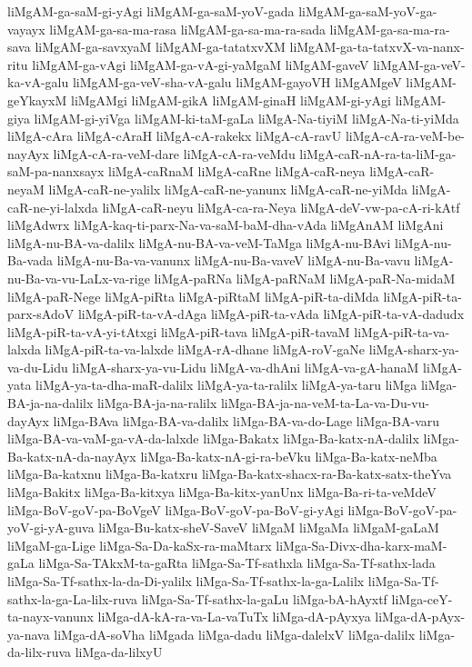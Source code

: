 {liMgAM-ga-saM-gi-yAgi
liMgAM-ga-saM-yoV-gada
liMgAM-ga-saM-yoV-ga-vayayx
liMgAM-ga-sa-ma-rasa
liMgAM-ga-sa-ma-ra-sada
liMgAM-ga-sa-ma-ra-sava
liMgAM-ga-savxyaM
liMgAM-ga-tatatxvXM
liMgAM-ga-ta-tatxvX-va-nanx-ritu
liMgAM-ga-vAgi
liMgAM-ga-vA-gi-yaMgaM
liMgAM-gaveV
liMgAM-ga-veV-ka-vA-galu
liMgAM-ga-veV-sha-vA-galu
liMgAM-gayoVH
liMgAMgeV
liMgAM-geYkayxM
liMgAMgi
liMgAM-gikA
liMgAM-ginaH
liMgAM-gi-yAgi
liMgAM-giya
liMgAM-gi-yiVga
liMgAM-ki-taM-gaLa
liMgA-Na-tiyiM
liMgA-Na-ti-yiMda
liMgA-cAra
liMgA-cAraH
liMgA-cA-rakekx
liMgA-cA-ravU
liMgA-cA-ra-veM-be-nayAyx
liMgA-cA-ra-veM-dare
liMgA-cA-ra-veMdu
liMgA-caR-nA-ra-ta-liM-ga-saM-pa-nanxsayx
liMgA-caRnaM
liMgA-caRne
liMgA-caR-neya
liMgA-caR-neyaM
liMgA-caR-ne-yalilx
liMgA-caR-ne-yanunx
liMgA-caR-ne-yiMda
liMgA-caR-ne-yi-lalxda
liMgA-caR-neyu
liMgA-ca-ra-Neya
liMgA-deV-vw-pa-cA-ri-kAtf
liMgAdwrx
liMgA-kaq-ti-parx-Na-va-saM-baM-dha-vAda
liMgAnAM
liMgAni
liMgA-nu-BA-va-dalilx
liMgA-nu-BA-va-veM-TaMga
liMgA-nu-BAvi
liMgA-nu-Ba-vada
liMgA-nu-Ba-va-vanunx
liMgA-nu-Ba-vaveV
liMgA-nu-Ba-vavu
liMgA-nu-Ba-va-vu-LaLx-va-rige
liMgA-paRNa
liMgA-paRNaM
liMgA-paR-Na-midaM
liMgA-paR-Nege
liMgA-piRta
liMgA-piRtaM
liMgA-piR-ta-diMda
liMgA-piR-ta-parx-sAdoV
liMgA-piR-ta-vA-dAga
liMgA-piR-ta-vAda
liMgA-piR-ta-vA-dadudx
liMgA-piR-ta-vA-yi-tAtxgi
liMgA-piR-tava
liMgA-piR-tavaM
liMgA-piR-ta-va-lalxda
liMgA-piR-ta-va-lalxde
liMgA-rA-dhane
liMgA-roV-gaNe
liMgA-sharx-ya-va-du-Lidu
liMgA-sharx-ya-vu-Lidu
liMgA-va-dhAni
liMgA-va-gA-hanaM
liMgA-yata
liMgA-ya-ta-dha-maR-dalilx
liMgA-ya-ta-ralilx
liMgA-ya-taru
liMga
liMga-BA-ja-na-dalilx
liMga-BA-ja-na-ralilx
liMga-BA-ja-na-veM-ta-La-va-Du-vu-dayAyx
liMga-BAva
liMga-BA-va-dalilx
liMga-BA-va-do-Lage
liMga-BA-varu
liMga-BA-va-vaM-ga-vA-da-lalxde
liMga-Bakatx
liMga-Ba-katx-nA-dalilx
liMga-Ba-katx-nA-da-nayAyx
liMga-Ba-katx-nA-gi-ra-beVku
liMga-Ba-katx-neMba
liMga-Ba-katxnu
liMga-Ba-katxru
liMga-Ba-katx-shacx-ra-Ba-katx-satx-theYva
liMga-Bakitx
liMga-Ba-kitxya
liMga-Ba-kitx-yanUnx
liMga-Ba-ri-ta-veMdeV
liMga-BoV-goV-pa-BoVgeV
liMga-BoV-goV-pa-BoV-gi-yAgi
liMga-BoV-goV-pa-yoV-gi-yA-guva
liMga-Bu-katx-sheV-SaveV
liMgaM
liMgaMa
liMgaM-gaLaM
liMgaM-ga-Lige
liMga-Sa-Da-kaSx-ra-maMtarx
liMga-Sa-Divx-dha-karx-maM-gaLa
liMga-Sa-TAkxM-ta-gaRta
liMga-Sa-Tf-sathxla
liMga-Sa-Tf-sathx-lada
liMga-Sa-Tf-sathx-la-da-Di-yalilx
liMga-Sa-Tf-sathx-la-ga-Lalilx
liMga-Sa-Tf-sathx-la-ga-La-lilx-ruva
liMga-Sa-Tf-sathx-la-gaLu
liMga-bA-hAyxtf
liMga-ceY-ta-nayx-vanunx
liMga-dA-kA-ra-va-La-vaTuTx
liMga-dA-pAyxya
liMga-dA-pAyx-ya-nava
liMga-dA-soVha
liMgada
liMga-dadu
liMga-dalelxV
liMga-dalilx
liMga-da-lilx-ruva
liMga-da-lilxyU
}
